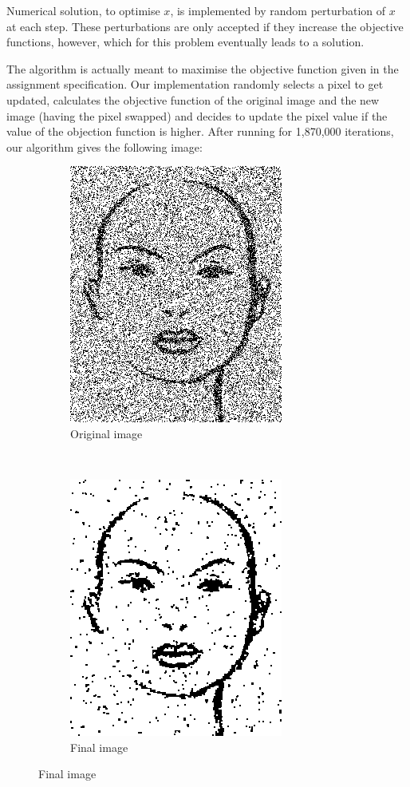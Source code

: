 \documentclass[11pt,a4paper,oneside]{report}
\begin{document}
Numerical solution, to optimise $x$, is implemented by random perturbation of
$x$ at each step. These perturbations are only accepted if they
increase the objective functions, however, which for this problem
eventually leads to a solution.

The algorithm is actually meant to maximise the objective function given in the 
assignment specification. Our implementation randomly selects a pixel to get 
updated, calculates the objective function of the original image and the new 
image (having the pixel swapped) and decides to update the pixel value if the 
value of the objection function is higher. After running for 1,870,000 
iterations, our algorithm gives the following image: 

\begin{figure}[H]
  \centering
  \begin{subfigure}[b]{0.3\textwidth}
	  \includegraphics[scale=0.6]{plots/xnoisy}
	  \caption{Original image}
	  \label{fig:gull}
  \end{subfigure}%
  ~ 
  \begin{subfigure}[b]{0.3\textwidth}
	  \includegraphics[scale=0.6]{plots/xclean0132}
	  \caption{Final image}
	  \label{fig:tiger}
  \end{subfigure}
\end{figure}
\end{document}
